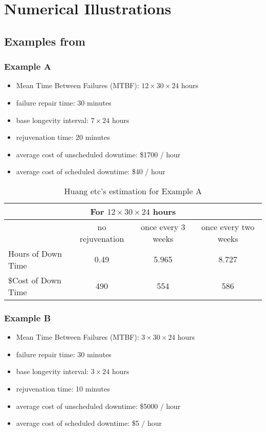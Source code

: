 \section{Numerical Illustrations}

\subsection{Examples from \citep{huang1995software}}

\subsubsection{Example A}
\begin{itemize}
  \item Mean Time Between Failures (MTBF): $12 \times 30 \times 24$ hours
  \item failure repair time:  30 minutes
  \item base longevity interval:  $7 \times 24$ hours
  \item rejuvenation time: 20 minutes
  \item average cost of unscheduled downtime: \$1700 / hour
  \item average cost of scheduled downtime: \$40 / hour  
\end{itemize}

\begin{table}[h]
\begin{tabular}{ | l || c | c | c | }
  \hline
   \multicolumn{4}{|c|}{For $12 \times 30 \times 24 $ hours } \\
  \hline                       
    & no rejuvenation & once every 3 weeks & once every two weeks \\
   \hline     
  Hours of Down Time  & 0.49 & 5.965 & 8.727 \\
  \hline    
  \$Cost of Down Time & 490  & 554 & 586 \\
  \hline 
\end{tabular}
  \caption{Huang etc's estimation for Example A}
\end{table}  
  


\subsubsection{Example B}
\begin{itemize}
  \item Mean Time Between Failures (MTBF): $3 \times 30 \times 24$ hours
  \item failure repair time:  30 minutes
  \item base longevity interval:  $3 \times 24$ hours
  \item rejuvenation time: 10 minutes
  \item average cost of unscheduled downtime: \$5000 / hour
  \item average cost of scheduled downtime: \$5 / hour  
\end{itemize}

